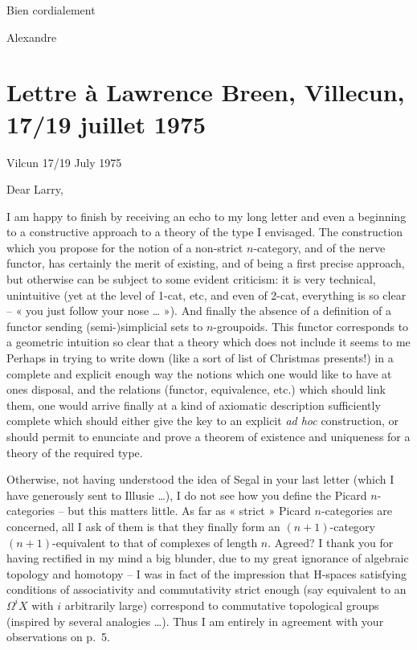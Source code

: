\documentclass[11pt,a4paper]{article}
\begin{document}
Bien cordialement

Alexandre

\section{Lettre à Lawrence Breen, Villecun, 17/19 juillet 1975}

Vilcun 17/19 July 1975

Dear Larry,

I am happy to finish by receiving an echo to my long letter and even a beginning to a constructive approach to a theory of the type I envisaged. The construction which you propose for the notion of a non-strict $n$-category, and of the nerve functor, has certainly the merit of existing, and of being a first precise approach, but otherwise can be subject to some evident criticism: it is very technical, unintuitive (yet at the level of 1-cat, etc, and even of 2-cat, everything is so clear -- « you just follow your nose … »). And finally the absence of a definition of a functor sending (semi-)simplicial sets to $n$-groupoids. This functor corresponds to a geometric intuition so clear that a theory which does not include it seems to me   Perhaps in trying to write down (like a sort of list of Christmas presents!) in a complete and explicit enough way the notions which one would like to have at ones disposal, and the relations (functor, equivalence, etc.) which should link them, one would arrive finally at a kind of axiomatic description sufficiently complete which should either give the key to an explicit \emph{ad hoc} construction, or should permit   to enunciate and prove a theorem of existence and uniqueness for a theory of the required type.

Otherwise, not having understood the idea of Segal in your last letter (which I have generously sent to Illusie …), I do not see how you define the Picard $n$-categories -- but this matters little. As far as « strict » Picard $n$-categories are concerned, all I ask of them is that they finally form an $(n+1)$-category $(n+1)$-equivalent to that of  complexes  of length $n$. Agreed? I thank you for having rectified in my mind a big blunder, due to my great ignorance of algebraic topology and homotopy -- I was in fact of the impression that H-spaces satisfying conditions of associativity and commutativity strict enough (say equivalent to an $\Omega^i X$ with $i$ arbitrarily large) correspond to commutative topological groups (inspired by several analogies …). Thus I am entirely in agreement with your observations on p.~5.
\end{document}
